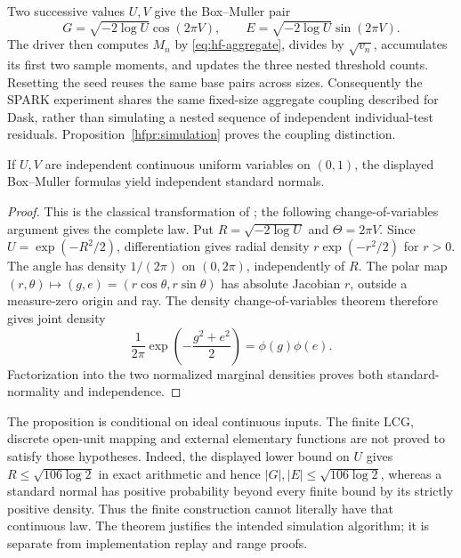 Two successive values \(U,V\) give the Box--Muller pair
\[
 G=\sqrt{-2\log U}\cos(2\pi V),\qquad
 E=\sqrt{-2\log U}\sin(2\pi V).
\]
The driver then computes \(M_n\) by \eqref{eq:hf-aggregate}, divides by
\(\sqrt{v_n}\), accumulates its first two sample moments, and updates the
three nested threshold counts. Resetting the seed reuses the same base
pairs across sizes. Consequently the SPARK experiment shares the same
fixed-size aggregate coupling described for Dask, rather than simulating
a nested sequence of independent individual-test residuals.
Proposition~\ref{hfpr:simulation} proves the coupling distinction.

\begin{proposition}\label{hfsp:box-muller}
If \(U,V\) are independent continuous uniform variables on \((0,1)\),
the displayed Box--Muller formulas yield independent standard normals.
\end{proposition}
\begin{proof}
This is the classical transformation of \citet{boxmuller1958hf}; the
following change-of-variables argument gives the complete law. Put
\(R=\sqrt{-2\log U}\) and \(\Theta=2\pi V\). Since
\(U=\exp(-R^2/2)\), differentiation gives radial density
\(r\exp(-r^2/2)\) for \(r>0\). The angle has density \(1/(2\pi)\)
on \((0,2\pi)\), independently of \(R\). The polar map
\((r,\theta)\mapsto(g,e)=(r\cos\theta,r\sin\theta)\)
has absolute Jacobian \(r\), outside a measure-zero origin and ray.
The density change-of-variables theorem therefore gives joint density
\[
 \frac{1}{2\pi}\exp\!\left(-\frac{g^2+e^2}{2}\right)
 =\phi(g)\phi(e).
\]
Factorization into the two normalized marginal densities proves both
standard-normality and independence.
\end{proof}
The proposition is conditional on ideal continuous inputs. The finite
LCG, discrete open-unit mapping and external elementary functions are not
proved to satisfy those hypotheses. Indeed, the displayed lower bound
on \(U\) gives \(R\leq\sqrt{106\log2}\) in exact arithmetic and hence
\(|G|,|E|\leq\sqrt{106\log2}\), whereas a standard normal has positive
probability beyond every finite bound by its strictly positive density.
Thus the finite construction cannot literally have that continuous law. The theorem
justifies the intended simulation algorithm; it is separate from
implementation replay and range proofs.

